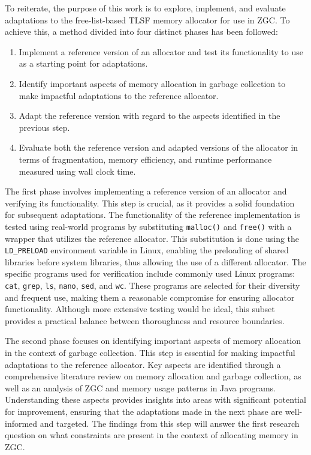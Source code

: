 
To reiterate, the purpose of this work is to explore, implement, and evaluate adaptations to the free-list-based TLSF memory allocator for use in ZGC. To achieve this, a method divided into four distinct phases has been followed:

\begin{enumerate}
    \item Implement a reference version of an allocator and test its functionality to use as a starting point for adaptations.
    \item Identify important aspects of memory allocation in garbage collection to make impactful adaptations to the reference allocator.
    \item Adapt the reference version with regard to the aspects identified in the previous step.
    \item Evaluate both the reference version and adapted versions of the allocator in terms of fragmentation, memory efficiency, and runtime performance measured using wall clock time.
\end{enumerate}

The first phase involves implementing a reference version of an allocator and verifying its functionality. This step is crucial, as it provides a solid foundation for subsequent adaptations. The functionality of the reference implementation is tested using real-world programs by substituting \texttt{malloc()} and \texttt{free()} with a wrapper that utilizes the reference allocator. This substitution is done using the \texttt{LD\_PRELOAD} environment variable in Linux, enabling the preloading of shared libraries before system libraries, thus allowing the use of a different allocator. The specific programs used for verification include commonly used Linux programs: \texttt{cat}, \texttt{grep}, \texttt{ls}, \texttt{nano}, \texttt{sed}, and \texttt{wc}. These programs are selected for their diversity and frequent use, making them a reasonable compromise for ensuring allocator functionality. Although more extensive testing would be ideal, this subset provides a practical balance between thoroughness and resource boundaries.

The second phase focuses on identifying important aspects of memory allocation in the context of garbage collection. This step is essential for making impactful adaptations to the reference allocator. Key aspects are identified through a comprehensive literature review on memory allocation and garbage collection, as well as an analysis of ZGC and memory usage patterns in Java programs. Understanding these aspects provides insights into areas with significant potential for improvement, ensuring that the adaptations made in the next phase are well-informed and targeted. The findings from this step will answer the first research question on what constraints are present in the context of allocating memory in ZGC.

